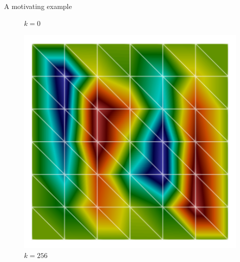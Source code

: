 \documentclass[]{beamer}
\begin{document}
\begin{frame}{A motivating example}
{\begin{minipage}{0.3\textwidth}
\begin{figure}
					\caption{$k=0$}
				\end{figure}
			\end{minipage}
			\begin{minipage}{0.3\textwidth}
				\begin{figure}
					\centering
					\includegraphics[scale=0.3]{Figures/helmholtz_N_6_omega_16.png}
					\caption{$k=256$}
				\end{figure}
			\end{minipage}
		}
\end{frame}
\end{document}
